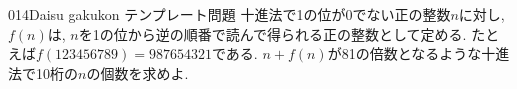 \begin{prob}{014}{}{Daisu gakukon テンプレート問題}
  十進法で1の位が0でない正の整数$n$に対し, $f(n)$は, $n$を1の位から逆の順番で読んで得られる正の整数として定める. たとえば$f(123456789) = 987654321$である.
    $n+f(n)$が81の倍数となるような十進法で10桁の$n$の個数を求めよ.
\end{prob}
